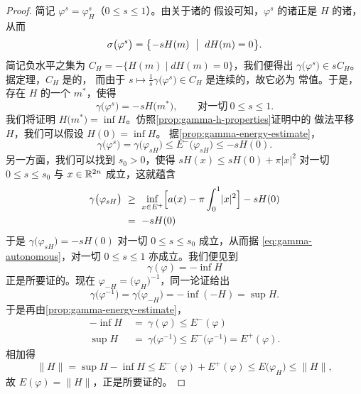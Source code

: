\begin{proof}
简记 $\varphi^{s}=\varphi_{H}^{s}$（$0\leq s\leq1$）。由关于诸\trPeriodicSolution{}的%
假设可知，$\varphi^{s}$ 的诸\trFixedPoint{}正是 $H$ 的诸\trCriticalPoint，从而
\[
\sigma\bigl(\varphi^{s}\bigr)=\bigl\{-sH(m)\ \bigm|\ dH(m)=0\bigr\}.
\]
简记负\trCritical{}水平之集为 $C_{H}=-\{H(m)\mid dH(m)=0\}$，我们便得出%
$\gamma\bigl(\varphi^{s}\bigr)\in sC_{H}$。据\trSard{}定理，$C_{H}$ 是\trNowhereDense{}的，%
而由于 $s\mapsto\frac{1}{s}\gamma\bigl(\varphi^{s}\bigr)\in C_{H}$ 是连续的，故它必为%
常值。于是，存在 $H$ 的一个\trCriticalPoint{} $m^{*}$，使得
\begin{equation}\label{eq:gamma-autonomous}
\gamma\bigl(\varphi^{s}\bigr)=-sH\bigl(m^{*}\bigr),\qquad\text{对一切}\ 0\leq s\leq1.
\end{equation}
我们将证明 $H\bigl(m^{*}\bigr)=\inf H$。仿照\cref{prop:gamma-h-properties}证明中的%
做法平移 $H$，我们可以假设 $H(0)=\inf H$。
据\cref{prop:gamma-energy-estimate}，
\[
\gamma\bigl(\varphi^{s}\bigr)=\gamma\bigl(\varphi_{sH}\bigr)\leq E^{-}\bigl(\varphi_{sH}\bigr)%
\leq-sH(0).
\]
另一方面，我们可以找到 $s_{0}>0$，使得 $sH(x)\leq sH(0)+\pi\lvert x\rvert^{2}$ 对一切%
$0\leq s\leq s_{0}$ 与 $x\in\mathbb{R}^{2n}$ 成立，这就蕴含
\begin{align*}
\gamma\bigl(\varphi_{sH}\bigr)\ &\geq\ \inf_{x\in E^{+}}\Bigl[a(x)-\pi\int_{0}^{1}\lvert x\rvert^{2}\Bigr]-sH(0)\\
&=\ -sH(0)
\end{align*}
于是 $\gamma\bigl(\varphi_{sH}\bigr)=-sH(0)$ 对一切 $0\leq s\leq s_{0}$ 成立，从而据%
\eqref{eq:gamma-autonomous}，对一切 $0\leq s\leq1$ 亦成立。我们便见到
\[
\gamma(\varphi)=-\inf H
\]
正是所要证的。现在 $\varphi_{-H}=\bigl(\varphi_{H}\bigr)^{-1}$，同一论证给出
\[
\gamma\bigl(\varphi^{-1}\bigr)=\gamma\bigl(\varphi_{-H}\bigr)=-\inf(-H)=\sup H.
\]
于是再由\cref{prop:gamma-energy-estimate}，
\begin{align*}
-\inf H\ &=\ \gamma(\varphi)\leq E^{-}(\varphi)\\
\sup H\ &=\ \gamma\bigl(\varphi^{-1}\bigr)\leq E^{-}\bigl(\varphi^{-1}\bigr)=E^{+}(\varphi).
\end{align*}
相加得
\[
\lVert H\rVert=\sup H-\inf H\leq E^{-}(\varphi)+E^{+}(\varphi)\leq E\bigl(\varphi_{H}\bigr)%
\leq\lVert H\rVert,
\]
故 $E(\varphi)=\lVert H\rVert$，正是所要证的。
\end{proof}

